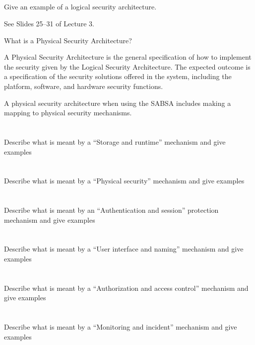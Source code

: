 \begin{questions}
\begin{parts}
  \part{} Give an example of a logical security architecture.
    \begin{solution}
      See Slides 25--31 of Lecture 3.
    \end{solution}
  \end{parts}

\question{} What is a Physical Security Architecture?
  \begin{solution}
    A Physical Security Architecture is the general specification of how to implement the security given by the Logical Security Architecture.
    The expected outcome is a specification of the security solutions offered in the system, including the platform, software, and hardware security functions.
  \end{solution}

\question{} A physical security architecture when using the SABSA includes making a mapping to physical security mechanisms.
  \begin{parts}
  \part{} Describe what is meant by a ``Storage and runtime'' mechanism and give examples
  \part{} Describe what is meant by a ``Physical security'' mechanism and give examples
  \part{} Describe what is meant by an ``Authentication and session'' protection mechanism and give examples
  \part{} Describe what is meant by a ``User interface and naming'' mechanism and give examples
  \part{} Describe what is meant by a ``Authorization and access control'' mechanism and give examples
  \part{} Describe what is meant by a ``Monitoring and incident'' mechanism and give examples

\end{parts}
\end{questions}
